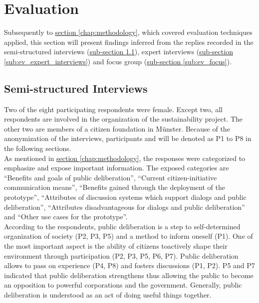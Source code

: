 \section{Evaluation}
\label{chap:evaluation}
Subsequently to \hyperref[chap:methodology]{section \ref{chap:methodology}}, which covered evaluation techniques applied, this section will present findings inferred from the replies recorded in the semi-structured interviews (\hyperref[sub:ev_interviews]{sub-section \ref{sub:ev_interviews}}), expert interviews (\hyperref[sub:ev_expert_interviews]{sub-section \ref{sub:ev_expert_interviews}}) and focus group (\hyperref[sub:ev_focus]{sub-section \ref{sub:ev_focus}}).


\subsection{Semi-structured Interviews}
\label{sub:ev_interviews}
Two of the eight participating respondents were female. Except two, all respondents are involved in the organization of the sustainability project. The other two are members of a citizen foundation in M{\"u}nster. Because of the anonymization of the interviews, participants and will be denoted as P1 to P8 in the following sections.\\
As mentioned in \hyperref[chap:methodology]{section \ref{chap:methodology}}, the responses were categorized to emphasize and expose important information. The exposed categories are ``Benefits and goals of public deliberation'', ``Current citizen-initiative communication means'', ``Benefits gained through the deployment of the prototype'', ``Attributes of discussion systems which support dialogs and public deliberation'', ``Attributes disadvantageous for dialogs and public deliberation'' and ``Other use cases for the prototype''.\\

According to the respondents, public deliberation is a step to self-determined organization of society (P2, P3, P5) and a method to inform oneself (P1). One of the most important aspect is the ability of citizens toactively shape their environment through participation (P2, P3, P5, P6, P7). Public deliberation allows to pass on experience (P4, P8) and fosters discussions (P1, P2). P5 and P7 indicated that public deliberation strengthens thus allowing the public to become an opposition to powerful corporations and the government. Generally, public deliberation is understood as an act of doing useful things together.

